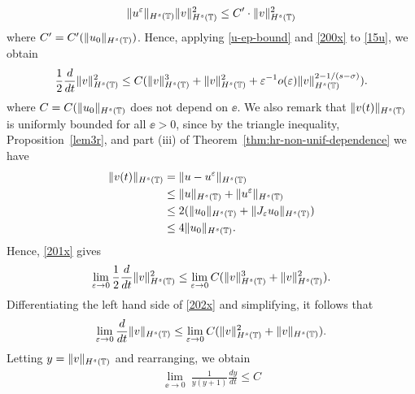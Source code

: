 \begin{equation}
\begin{split}
\|u^\varepsilon\|_{H^s(\mathbb{T})} \|v\|_{H^s(\mathbb{T})}^2 \le C'
\cdot \|v\|_{H^s(\mathbb{T})}^2
\label{u-ep-bound}
\end{split}
\end{equation}
where $C' = C'(\|u_0\|_{H^s(\mathbb{T})})$. Hence, applying \eqref{u-ep-bound} and \eqref{200x} to \eqref{15u}, we obtain
\begin{equation}
\begin{split}
\frac{1}{2} \frac{d}{dt} \|v\|_{H^s(\mathbb{T})}^2 \le C (
\|v\|_{H^s(\mathbb{T})}^3 + \|v\|_{H^s(\mathbb{T})}^2 + \varepsilon ^{-1} o(\varepsilon) \|v\|_{H^s(\mathbb{T})}^{2-
1/(s- \sigma)}).
\label{201x}
\end{split}
\end{equation}
where $C=C(\|u_0\|_{H^s(\mathbb{T})}$ does not depend on $\ee$. We also remark 
that $\|v(t)\|_{H^s(\mathbb{T})}$ is uniformly bounded for all $\ee > 0$, since by
the triangle inequality, Proposition~\ref{lem3r}, and part (iii) of Theorem~\ref{thm:hr-non-unif-dependence} we have
\begin{equation*}
\begin{split}
\|v(t) \|_{H^s(\mathbb{T})}
& = \|u - u^\varepsilon \|_{H^s(\mathbb{T})}
\\
& \le \|u \|_{H^s(\mathbb{T})} + \|u^\varepsilon \|_{H^s(\mathbb{T})}
\\
& \le 2( \|u_0\|_{H^s(\mathbb{T})} + \|J_\varepsilon u_0\|_{H^s(\mathbb{T})})
\\
& \le 4 \|u_0\|_{H^s(\mathbb{T})}.
\end{split}
\end{equation*}
Hence, \eqref{201x} gives
\begin{equation}
\begin{split}
\lim_{\varepsilon \to 0} \frac{1}{2} \frac{d}{dt} \|v\|_{H^s(\mathbb{T})}^2 \le
\lim_{\varepsilon \to 0} C (
\|v\|_{H^s(\mathbb{T})}^3 + \|v\|_{H^s(\mathbb{T})}^2).
\label{202x}
\end{split}
\end{equation}
Differentiating the left hand side of
\eqref{202x} and simplifying, it follows that
\begin{equation*}
\begin{split}
\lim_{\varepsilon \to 0}\frac{d}{dt} \|v\|_{H^s(\mathbb{T})} \le
\lim_{\varepsilon \to 0} C (\|v\|_{H^s(\mathbb{T})}^2 +
\|v\|_{H^s(\mathbb{T})}).
\end{split}
\end{equation*}
Letting $y = \|v\|_{H^s(\mathbb{T})}$ and rearranging, we obtain
\begin{equation*}
\begin{split}
\lim_{\ee \to 0} \ \frac{1}{y(y+1)} \frac{dy}{dt} \le C	
\end{split}
\end{equation*}
